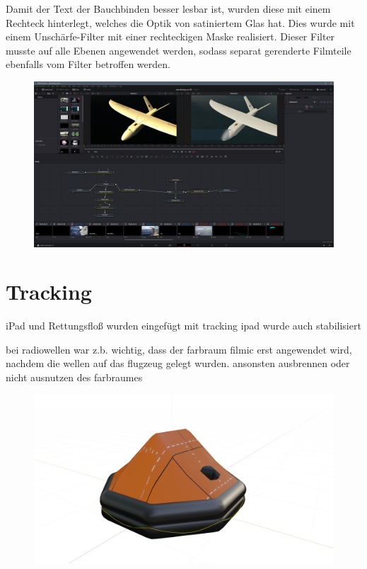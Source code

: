 Damit der Text der Bauchbinden besser lesbar ist, wurden diese mit einem Rechteck hinterlegt, welches die Optik von satiniertem Glas hat. Dies wurde mit einem Unschärfe-Filter mit einer rechteckigen Maske realisiert. Dieser Filter musste auf alle Ebenen angewendet werden, sodass separat gerenderte Filmteile ebenfalls vom Filter betroffen werden.

\begin{figure}[H]
\begin{center}
\includegraphics[width=\textwidth]{gfx/post/resolve3.jpg}
\caption{}
\label{resolve3}
\end{center}
\end{figure}

\section{Tracking}

iPad und Rettungsfloß wurden eingefügt mit tracking
ipad wurde auch stabilisiert

bei radiowellen war z.b. wichtig, dass der farbraum filmic erst angewendet wird, nachdem die wellen auf das flugzeug gelegt wurden. ansonsten ausbrennen oder nicht ausnutzen des farbraumes


\begin{figure}[H]
\begin{center}
\includegraphics[width=\textwidth]{gfx/prod/boat/liferaft1.jpg}
\caption{}
\label{liferaft1}
\end{center}
\end{figure}

